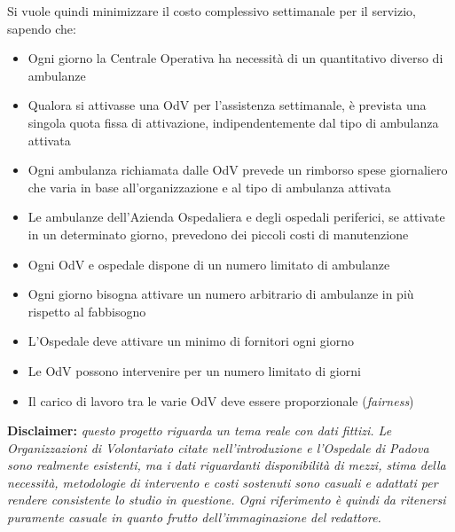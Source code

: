 \newline \newline
Si vuole quindi minimizzare il costo complessivo settimanale per il servizio, sapendo che:
\begin{itemize}
    \item Ogni giorno la Centrale Operativa ha necessità di un quantitativo diverso di ambulanze
    \item Qualora si attivasse una OdV per l'assistenza settimanale, è prevista una singola quota fissa di attivazione, indipendentemente dal tipo di ambulanza attivata
    \item Ogni ambulanza richiamata dalle OdV prevede un rimborso spese giornaliero che varia in base all'organizzazione e al tipo di ambulanza attivata
    \item Le ambulanze dell'Azienda Ospedaliera e degli ospedali periferici, se attivate in un determinato giorno, prevedono dei piccoli costi di manutenzione
    \item Ogni OdV e ospedale dispone di un numero limitato di ambulanze
    \item Ogni giorno bisogna attivare un numero arbitrario di ambulanze in più rispetto al fabbisogno
    \item L'Ospedale deve attivare un minimo di fornitori ogni giorno
    \item Le OdV possono intervenire per un numero limitato di giorni
    \item Il carico di lavoro tra le varie OdV deve essere proporzionale (\textit{fairness})
\end{itemize}
\vspace*{3 cm}
\textbf{Disclaimer: } \textit{questo progetto riguarda un tema reale con dati fittizi. Le Organizzazioni di Volontariato citate nell'introduzione e l'Ospedale di Padova sono realmente esistenti, ma i dati riguardanti disponibilità di mezzi, stima della necessità, metodologie di intervento e costi sostenuti sono casuali e adattati per rendere consistente lo studio in questione. Ogni riferimento è quindi da ritenersi puramente casuale in quanto frutto dell'immaginazione del redattore.}